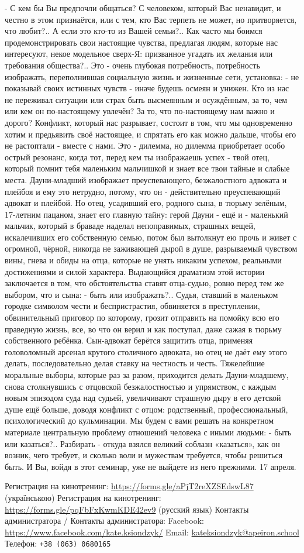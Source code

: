 - С кем бы Вы предпочли общаться?
С человеком, который Вас ненавидит, и честно в этом признаётся, или с тем, кто Вас терпеть не может, но притворяется, что любит?..
А если это кто-то из Вашей семьи?..
Как часто мы боимся продемонстрировать свои настоящие чувства, предлагая людям, которые нас интересуют, некое модельное сверх-Я: призванное угадать их желания или требования общества?..
Это - очень глубокая потребность, потребность изображать, переполнившая социальную жизнь и жизненные сети, установка:
- не показывай своих истинных чувств - иначе будешь осмеян и унижен.
Кто из нас не переживал ситуации или страх быть высмеянным и осуждённым, за то, чем или кем он по-настоящему увлечён? За то, что по-настоящему нам важно и дорого?  
Конфликт, который нас разрывает, состоит в том, что мы одновременно хотим и предьявить своё настоящее, и спрятать его как можно дальше, чтобы его не растоптали - вместе с нами. 
Это - дилемма, но дилемма приобретает особо острый резонанс, когда тот, перед кем ты изображаешь успех - твой отец, который помнит тебя маленьким мальчишкой и знает все твои тайные и слабые места. 
Дауни-младший изображает преуспевающего, безжалостного адвоката и плейбоя и ему это нетрудно, потому, что он - действительно преуспевающий адвокат и плейбой.
Но отец, усадивший его, родного сына, в тюрьму зелёным, 17-летним пацаном, знает его главную тайну: герой Дауни - ещё и - маленький мальчик, который в браваде наделал непоправимых, страшных вещей, искалечивших его собственную семью, потом был вытолкнут ею прочь и живет с огромной, чёрной, никогда не заживающей дырой в душе, разрываемый чувством вины, гнева и обиды на отца, которые не унять никаким успехом, реальными достижениями и силой характера. 
Выдающийся драматизм этой истории заключается в том, что обстоятельства ставят отца-судью, ровно перед тем же выбором, что и сына:
- быть или изображать?..
Судья, ставший в маленьком городке символом чести и беспристрастия, обвиняется в преступлении, обвинительный приговор по которому, грозит отправить на помойку всю его праведную жизнь, все, во что он верил и как поступал, даже сажая в тюрьму собственного ребёнка.
Сын-адвокат берётся защитить отца, применяя головоломный арсенал крутого столичного адвоката, но отец не даёт ему этого делать, последовательно делая ставку на честность и честь.
Тяжелейшие моральные выборы, которые раз за разом, приходится делать Дауни-младшему, снова столкнувшись с отцовской безжалостностью и упрямством, с каждым новым эпизодом суда над судьей, увеличивают страшную дыру в его детской душе ещё больше, доводя конфликт с отцом: родственный, профессиональный, психологический до кульминации. 
Мы будем с вами решать на конкретном материале центральную проблему отношений человека с иными людьми:
- быть или казаться?..
Разбирать - откуда взялся великий соблазн «казаться», как он возник, чего требует, и сколько воли и мужествам требуется, чтобы решиться быть.
И Вы, войдя в этот семинар, уже не выйдете из него прежними.
17 апреля.

Регистрация на кинотренинг:
 \url{https://forms.gle/aPjT2reXZSEdswL87} (українською)
 Регистрация на кинотренинг:
 \url{https://forms.gle/pqFbFxKwmKDE42ev9} (русский язык)
 Контакты администратора / Контакты администратора:
Facebook: \url{https://www.facebook.com/kate.ksiondzyk/}
Email: \url{kateksiondzyk@apeiron.school}
Телефон: \verb|+38 (063) 0680165|
